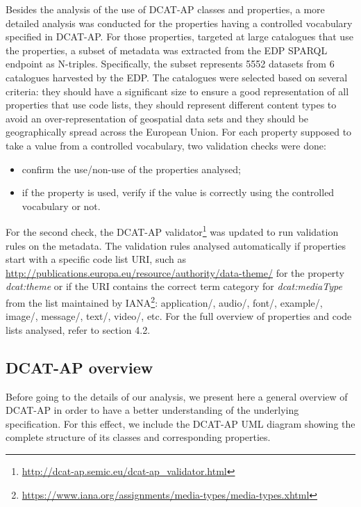 \documentclass[<options>]{elsarticle}
\begin{document}
Besides the analysis of the use of DCAT-AP classes and properties, a more detailed analysis was conducted for the properties having a controlled vocabulary specified in DCAT-AP. For those properties, targeted at large catalogues that use the properties, a subset of metadata was extracted from the EDP SPARQL endpoint as N-triples. Specifically, the subset represents 5552 datasets from 6 catalogues harvested by the EDP. The catalogues were selected based on several criteria: they should have a significant size to ensure a good representation of all properties that use code lists, they should represent different content types to avoid an over-representation of geospatial data sets and they should be geographically spread across the European Union. For each property supposed to take a value from a controlled vocabulary, two validation checks were done:

\begin{itemize}
\item confirm the use/non-use of the properties analysed;
\item if the property is used, verify if the value is correctly using the controlled vocabulary or not.
\end{itemize}

For the second check, the DCAT-AP validator\footnote{\href{ http://dcat-ap.semic.eu/dcat-ap_validator.html}{ http://dcat-ap.semic.eu/dcat-ap\_validator.html}} was updated to run validation rules on the metadata. The validation rules analysed automatically if properties start with a specific code list URI, such as \url{http://publications.europa.eu/resource/authority/data-theme/} for the property \textit{dcat:theme} or if the URI contains the correct term category for \textit{dcat:mediaType} from the list maintained by IANA\footnote{\href{  https://www.iana.org/assignments/media-types/media-types.xhtml}{https://www.iana.org/assignments/media-types/media-types.xhtml}}: application/, audio/, font/, example/, image/, message/, text/, video/, etc.  For the full overview of properties and code lists analysed, refer to section 4.2. 
% 
% 
% 

\subsection{DCAT-AP overview}

Before going to the details of our analysis, we present here a general overview of DCAT-AP in order to have a better understanding of the underlying specification. For this effect, we include the DCAT-AP UML diagram showing the complete structure of its classes and corresponding properties.
\end{document}
